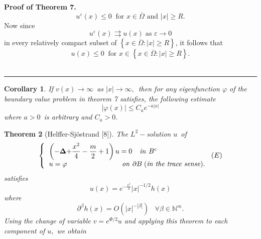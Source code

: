 \documentclass{article}
\newtheorem{theorem}{Theorem}
\newtheorem{corollary}[theorem]{Corollary}
\newenvironment{proof}[1][Proof]{\noindent\textbf{#1.} }{\ \rule{0.5em}{0.5em}}
\begin{document}
\begin{proof}[Proof of Theorem 7]
\begin{equation}
u^{\varepsilon }(x)\leq 0\;\;\text{for }x\in \overline{\Omega }\text{ and }%
\left| x\right| \geq R.
\end{equation}%
Now since 
\begin{equation}
u^{\varepsilon }(x)\rightrightarrows u(x)\;\text{as\ }\varepsilon
\rightarrow 0
\end{equation}%
in every relatively compact subset of $\left\{ x\in \overline{\Omega }%
:\left| x\right| \geq R\right\} $, it follows that%
\begin{equation}
u(x)\leq 0\;\;\text{for }x\in \left\{ x\in \overline{\Omega }:\left|
x\right| \geq R\right\} .
\end{equation}
\end{proof}

\begin{corollary}
\textit{If }$v(x)\rightarrow \infty $\textit{\ as }$\left\vert x\right\vert
\rightarrow \infty ,$\textit{\ then for any eigenfunction }$\varphi $ 
\textit{of the boundary value problem in theorem 7 satisfies, the following
estimate}%
\begin{equation}
\left\vert \varphi (x)\right\vert \leq C_{a}e^{-a\left\vert x\right\vert }
\end{equation}%
\textit{where }$a>0$\textit{\ is arbitrary and }$C_{a}>0.$
\end{corollary}

\begin{theorem}[{Helffer-Sj\"{o}strand [8]}]
\textit{The }$L^{2}-$\textit{solution }$u$\textit{\ of }%
\begin{equation}
\left\{ 
\begin{tabular}{l}
$\left( \mathbf{-\Delta +}\dfrac{x^{2}}{4}-\dfrac{m}{2}+1\right) u=0$\textit{%
\ \ \ in }$B^{c}$ \\ 
$u=\varphi $\textit{\ \ \ \ \ \ \ \ \ \ \ \ \ \ \ \ \ \ \ \ \ \ on }$%
\partial B\;($\textit{in the trace sense}$).$%
\end{tabular}%
\right. (E)
\end{equation}%
\textit{satisfies}%
\begin{equation}
u(x)=e^{-\tfrac{x^{2}}{4}}\left| x\right| ^{-1/2}h(x)
\end{equation}%
\textit{where} 
\begin{equation}
\partial ^{\beta }h(x)=O(\left| x\right| ^{-\left| \beta \right|
})\;\;\;\forall \beta \in \mathbb{N}^{m}.
\end{equation}%
Using the change of variable $v=e^{\Phi /2}u$ and applying this theorem to
each component of $u,$ we obtain
\end{theorem}
\end{document}
